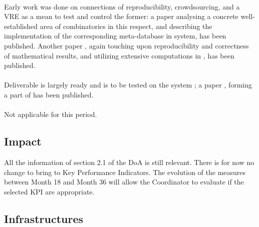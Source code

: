 \documentclass{deliverablereport}
\begin{document}
  \paragraph{} %
  Early work was done on connections
  of reproducibility, crowdsourcing, and a VRE as a mean to test and control the former: a
  paper \cite{2016arXiv160100181C} analysing a concrete well-established area of
  combinatorics in this respect, and describing the implementation of the corresponding
  meta-database in \Sage system, has been published. Another paper \cite{2016arXiv160301710P},
  again touching upon reproducibility and correctness of mathematical results, and
  utilizing extensive computations in \GAP, has been published.

  \paragraph{} %
  Deliverable 
  is largely ready and is to be tested on the
  system \Sage; a paper \cite{Pavlou:2016:MCI:2936924.2936934}, forming a part of
   has been published.

  \paragraph{} %
  Not applicable for this period.



  \subsection{Impact}

  All the information of section 2.1 of the DoA is still relevant. There is for now no
  change to bring to Key Performance Indicators. The evolution of the measures between
  Month 18 and Month 36 will allow the Coordinator to evaluate if the selected KPI are
  appropriate.

\subsection{Infrastructures}
\end{document}
